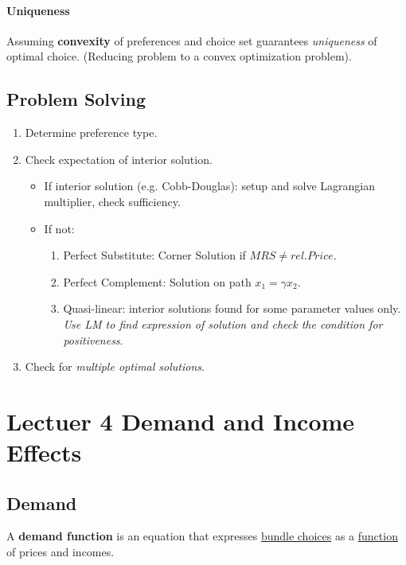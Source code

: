 \documentclass[]{article}
\begin{document}
            \paragraph{Uniqueness} Assuming \textbf{convexity} of preferences and choice set guarantees \emph{uniqueness} of optimal choice. (Reducing problem to a convex optimization problem).
        
        \subsection{Problem Solving}
            \begin{enumerate}
                \item Determine preference type.
                \item Check expectation of interior solution.
                \begin{itemize}
                    \item If interior solution (e.g. Cobb-Douglas): setup and solve Lagrangian multiplier, check sufficiency.
                    \item If not:
                    \begin{enumerate}
                        \item Perfect Substitute: Corner Solution if $MRS \neq rel.Price$.
                        \item Perfect Complement: Solution on path $x_1=\gamma x_2$.
                        \item Quasi-linear: interior solutions found for some parameter values only. \emph{Use LM to find expression of solution and check the condition for positiveness}.
                    \end{enumerate}
                \end{itemize}
                \item Check for \emph{multiple optimal solutions}.
            \end{enumerate}
            
    \section{Lectuer 4 Demand and Income Effects}
        \subsection{Demand}
            \begin{definition}
                A \textbf{demand function} is an equation that expresses \ul{bundle choices} as a \ul{function} of prices and incomes.
            \end{definition}
            
\end{document}
